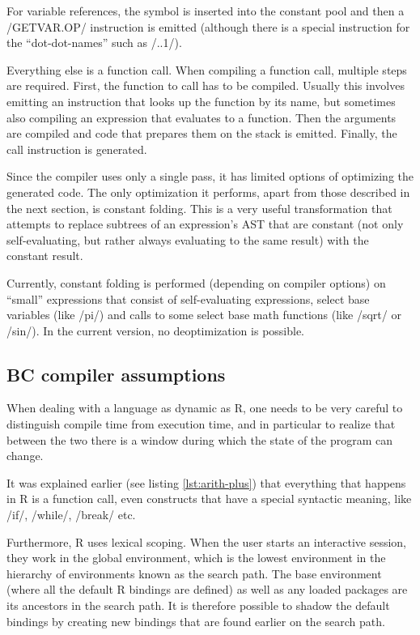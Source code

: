 {For variable references, the symbol is inserted into the constant pool and then a \rinline/GETVAR.OP/ instruction is emitted (although there is a special instruction for the ``dot-dot-names'' such as \rinline/..1/).

Everything else is a function call. When compiling a function call, multiple steps are required. First, the function to call has to be compiled. Usually this involves emitting an instruction that looks up the function by its name, but sometimes also compiling an expression that evaluates to a function. Then the arguments are compiled and code that prepares them on the stack is emitted. Finally, the call instruction is generated.

Since the compiler uses only a single pass, it has limited options of optimizing the generated code. The only optimization it performs, apart from those described in the next section, is constant folding. This is a very useful transformation that attempts to replace subtrees of an expression's AST that are constant (not only self-evaluating, but rather always evaluating to the same result) with the constant result.

Currently, constant folding is performed (depending on compiler options) on ``small'' expressions that consist of self-evaluating expressions, select base variables (like \rinline/pi/) and calls to some select base math functions (like \rinline/sqrt/ or \rinline/sin/). In the current version, no deoptimization is possible.

\subsection{BC compiler assumptions\label{assumptions}}

When dealing with a language as dynamic as R, one needs to be very careful to distinguish compile time from execution time, and in particular to realize that between the two there is a window during which the state of the program can change.

It was explained earlier (see listing \ref{lst:arith-plus}) that everything that happens in R is a function call, even constructs that have a special syntactic meaning, like \rinline/if/, \rinline/while/, \rinline/break/ etc.

Furthermore, R uses lexical scoping. When the user starts an interactive session, they work in the global environment, which is the lowest environment in the hierarchy of environments known as the search path. The base environment (where all the default R bindings are defined) as well as any loaded packages are its ancestors in the search path. It is therefore possible to shadow the default bindings by creating new bindings that are found earlier on the search path.

}
